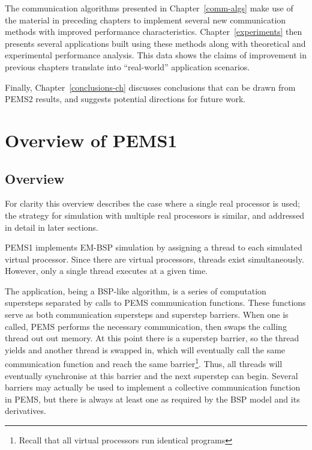 \documentclass[12pt]{carletoncsthesis}
\begin{document}
The communication algorithms presented in Chapter~\ref{comm-algs} make use
of the material in preceding chapters to implement several new communication
methods with improved performance characteristics.  Chapter~\ref{experiments}
then presents several applications built using these methods along with
theoretical and experimental performance analysis.  This data shows the
claims of improvement in previous chapters translate into ``real-world''
application scenarios.

Finally, Chapter~\ref{conclusions-ch} discusses conclusions that can be
drawn from PEMS2 results, and suggests potential directions for future work.


\chapter{Overview of PEMS1}
\thispagestyle{empty}
\label{pems1-ch}


\section{Overview}
\label{overview}


For clarity this overview describes the case where a single real processor
is used; the strategy for simulation with multiple real processors is
similar, and addressed in detail in later sections.

PEMS1 implements EM-BSP simulation by assigning a thread to each simulated
virtual processor.  Since there are  virtual processors,  threads
exist simultaneously.  However, only a single thread executes at a given time.

The application, being a BSP-like algorithm, is a series of computation
supersteps separated by calls to PEMS communication functions.  These functions
serve as both communication supersteps and superstep barriers.  When one is
called, PEMS performs the necessary communication, then swaps the calling
thread out out memory.  At this point there is a superstep barrier, so the
thread yields and another thread is swapped in, which will eventually call
the same communication function and reach the same barrier\footnote{Recall
that all virtual processors run identical programs}.  Thus, all threads will
eventually synchronise at this barrier and the next superstep can begin.
Several barriers may actually be used to implement a collective communication
function in PEMS, but there is always at least one as required by the BSP
model and its derivatives.
\end{document}
